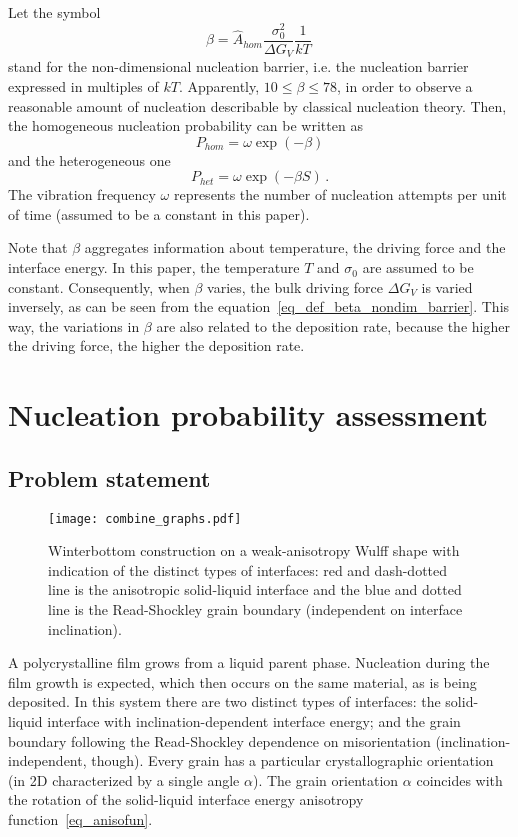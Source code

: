 	Let the symbol 
	\begin{equation}\label{eq_def_beta_nondim_barrier}
		\beta = \hat{A}_{hom}\frac{\sigma_0^2}{\Delta G_V}\frac{1}{kT}\,
	\end{equation}
	stand for the non-dimensional nucleation barrier, i.e. the nucleation barrier expressed in multiples of $kT$. Apparently, $10\leq\beta\leq78$, in order to observe a reasonable amount of nucleation describable by classical nucleation theory. Then, the homogeneous nucleation probability can be written as
	\begin{equation}
		P_{hom} = \omega\exp(-\beta)
	\end{equation}
	and the heterogeneous one
	\begin{equation}
		P_{het} = \omega\exp(-\beta S) \,.
	\end{equation}
	The vibration frequency $\omega$ represents the number of nucleation attempts per unit of time (assumed to be a constant in this paper).
	
	Note that $\beta$ aggregates information about temperature, the driving force and the interface energy. In this paper, the temperature $T$ and $\sigma_0$ are assumed to be constant. Consequently, when $\beta$ varies, the bulk driving force $\Delta G_V$ is varied inversely, as can be seen from the equation~\eqref{eq_def_beta_nondim_barrier}. This way, the variations in $\beta$ are also related to the deposition rate, because the higher the driving force, the higher the deposition rate.    

\section{Nucleation probability assessment} \label{sec_NPA}
	\subsection{Problem statement}
	\begin{figure}
		\centering
		\texttt{[image: combine\_graphs.pdf]}
		\caption[Winterbottom construction on a weak-anisotropy Wulff]{Winterbottom construction on a weak-anisotropy Wulff shape with indication of the distinct types of interfaces: red and dash-dotted line is the anisotropic solid-liquid interface and the blue and dotted line is the Read-Shockley grain boundary (independent on interface inclination). }
		\label{fig_NPA_sketch_of_problem}
	\end{figure}
	A polycrystalline film grows from a liquid parent phase. Nucleation during the film growth is expected, which then occurs on the same material, as is being deposited. In this system there are two distinct types of interfaces: the solid-liquid interface with inclination-dependent interface energy; and the grain boundary following the Read-Shockley dependence on misorientation (inclination-independent, though). Every grain has a particular crystallographic orientation (in 2D characterized by a single angle $\alpha$). The grain orientation $\alpha$ coincides with the rotation of the solid-liquid interface energy anisotropy function~\eqref{eq_anisofun}.
	
